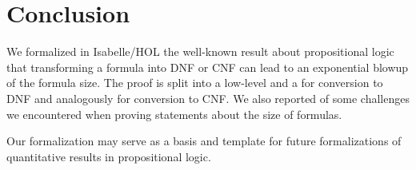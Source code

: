\documentclass[a4paper,USenglish,cleveref, autoref, thm-restate]{lipics-v2021}
\theoremstyle{definition}
\begin{document}
\section{Conclusion}
\label{sec_concl}

We formalized in Isabelle/HOL the well-known result about propositional logic that transforming a formula into DNF or CNF can lead to an exponential blowup of the formula size.
The proof is split into a low-level  and a  for conversion to DNF and analogously for conversion to CNF.
We also reported of some challenges we encountered when proving statements about the size of formulas.

Our formalization may serve as a basis and template for future formalizations of quantitative results in propositional logic.




\end{document}
